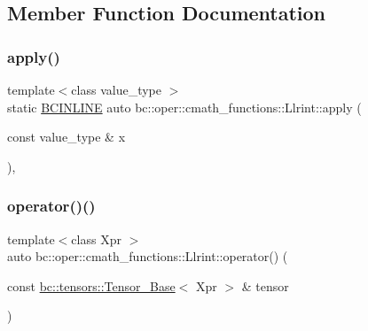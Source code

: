 \subsection{Member Function Documentation}
\mbox{\label{structbc_1_1oper_1_1cmath__functions_1_1Llrint_ac81877dcfa9bf717c464597ebacc92ad}} 
\subsubsection{\texorpdfstring{apply()}{apply()}}
{\footnotesize\ttfamily template$<$class value\+\_\+type $>$ \\
static \hyperlink{common_8h_a6699e8b0449da5c0fafb878e59c1d4b1}{B\+C\+I\+N\+L\+I\+NE} auto bc\+::oper\+::cmath\+\_\+functions\+::\+Llrint\+::apply (\begin{DoxyParamCaption}\item[{const value\+\_\+type \&}]{x }\end{DoxyParamCaption})\hspace{0.3cm}{\ttfamily [inline]}, {\ttfamily [static]}}

\mbox{\label{structbc_1_1oper_1_1cmath__functions_1_1Llrint_afa9b799d3365fbb74fd418b0f1fac805}} 
\subsubsection{\texorpdfstring{operator()()}{operator()()}\hspace{0.1cm}{\footnotesize\ttfamily [1/3]}}
{\footnotesize\ttfamily template$<$class Xpr $>$ \\
auto bc\+::oper\+::cmath\+\_\+functions\+::\+Llrint\+::operator() (\begin{DoxyParamCaption}\item[{const \hyperlink{classbc_1_1tensors_1_1Tensor__Base}{bc\+::tensors\+::\+Tensor\+\_\+\+Base}$<$ Xpr $>$ \&}]{tensor }\end{DoxyParamCaption})\hspace{0.3cm}{\ttfamily [inline]}}

